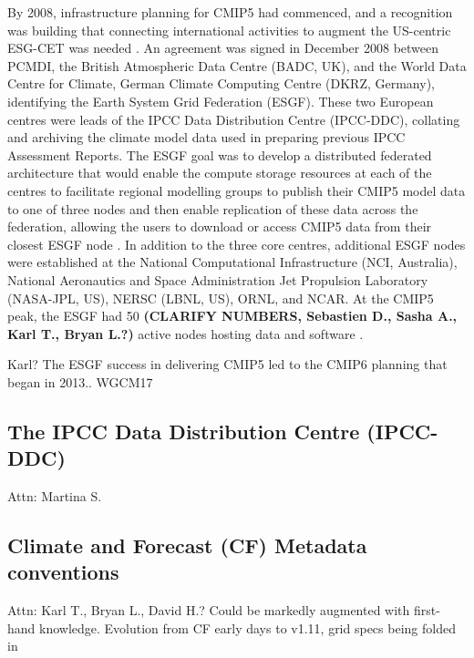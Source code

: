 \documentclass[gmd, preprint]{copernicus}
\newcommand{\mycomment}[1]{}
\def\cred#1{{\color{red}#1}}
\begin{document}
By 2008, infrastructure planning for CMIP5 had commenced, and a recognition was building that connecting international activities to augment the US-centric ESG-CET was needed \citep{williams_global_2016}. An agreement was signed in December 2008 between PCMDI, the British Atmospheric Data Centre (BADC, UK), and the World Data Centre for Climate, German Climate Computing Centre (DKRZ, Germany), identifying the Earth System Grid Federation (ESGF). These two European centres were leads of the IPCC Data Distribution Centre (IPCC-DDC), collating and archiving the climate model data used in preparing previous IPCC Assessment Reports. The ESGF goal was to develop a distributed federated architecture that would enable the compute storage resources at each of the centres to facilitate regional modelling groups to publish their CMIP5 model data to one of three nodes and then enable replication of these data across the federation, allowing the users to download or access CMIP5 data from their closest ESGF node \citep{williams_earth_2011}. In addition to the three core centres, additional ESGF nodes were established at the National Computational Infrastructure (NCI, Australia), National Aeronautics and Space Administration Jet Propulsion Laboratory (NASA-JPL, US), NERSC (LBNL, US), ORNL, and NCAR. At the CMIP5 peak, the ESGF had 50 \cred{\textbf{(CLARIFY NUMBERS, Sebastien D., Sasha A., Karl T., Bryan L.?)}} active nodes hosting data and software \citep{williams_global_2016}.
\mycomment{
CMIP6 current nodes - https://aims2.llnl.gov/nodes
Very early CMIP5 http://web.archive.org/web/20111015000202/http://pcmdi3.llnl.gov/esgcet/home.htm 7 nodes ESG-CET + BADC, WDCC, NCI
ESG-CET NCAR, LLNL, ORNL https://extranet.gfdl.noaa.gov/~vb/curator/AR5-20071017/ESG-CET200710.pdf Oct 2007
2013 Aspen workshop - https://www.wcrp-climate.org/images/modelling/WGCM/WGCM17/WGCM17_report.pdf;
Middleton, Foster and Williams et al., 2006: Earth System Grid II final report 2001-2006 SCIDAC https://www.osti.gov/servlets/purl/1113798 https://doi.org/10.2172/1113798
}
\cred{Karl? The ESGF success in delivering CMIP5 led to the CMIP6 planning that began in 2013.. WGCM17}


\subsection{The IPCC Data Distribution Centre (IPCC-DDC)}
\label{sec:IPCC-DDC}
\cred{Attn: Martina S.}
\citep{stockhause_cmip6_2017,stockhause_twenty-five_2022}


\subsection{Climate and Forecast (CF) Metadata conventions}
\label{sec:CFConventions}
\cred{Attn: Karl T., Bryan L., David H.? Could be markedly augmented with first-hand knowledge. Evolution from CF early days to v1.11, grid specs being folded in}
\end{document}
